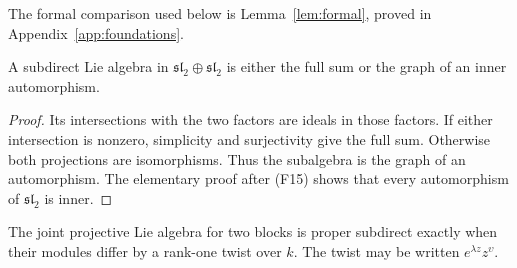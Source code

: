 The formal comparison used below is Lemma~\ref{lem:formal}, proved in
Appendix~\ref{app:foundations}.
\begin{lemma}\label{lem:goursat}
A subdirect Lie algebra in $\mathfrak{sl}_2\oplus\mathfrak{sl}_2$ is
either the full sum or the graph of an inner automorphism.
\end{lemma}
\begin{proof}
Its intersections with the two factors are ideals in those factors.
If either intersection is nonzero, simplicity and surjectivity give
the full sum. Otherwise both projections are isomorphisms. Thus the
subalgebra is the graph of an automorphism. The elementary proof after
(F15) shows that every automorphism of $\mathfrak{sl}_2$ is inner.
\end{proof}

\begin{lemma}\label{lem:twist}
The joint projective Lie algebra for two blocks is proper subdirect
exactly when their modules differ by a rank-one twist over $k$.
The twist may be written $e^{\lambda z}z^\upsilon$.
\end{lemma}
